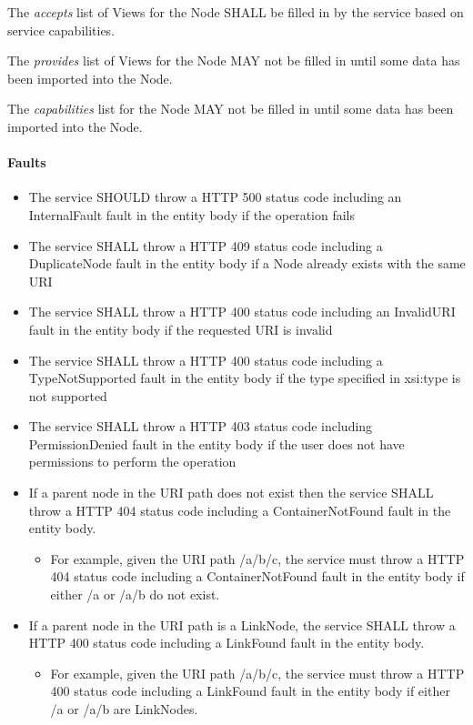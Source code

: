 \documentclass[11pt,a4paper]{ivoa}
\begin{document}
The \emph{accepts} list of Views for the Node SHALL be filled in by the service based on service capabilities.

The \emph{provides} list of Views for the Node MAY not be filled in until some data has been imported into the Node.

The \emph{capabilities} list for the Node MAY not be filled in until some data has been imported into the Node.

\paragraph{Faults}
\begin{itemize}
    \item The service SHOULD throw a HTTP 500 status code including an InternalFault fault in the entity body if the operation fails
    \item The service SHALL throw a HTTP 409 status code including a DuplicateNode fault in the entity body if a Node already exists with the same URI
    \item The service SHALL throw a HTTP 400 status code including an InvalidURI fault in the entity body if the requested URI is invalid
    \item The service SHALL throw a HTTP 400 status code including a TypeNotSupported fault in the entity body if the type specified in xsi:type is not supported
    \item The service SHALL throw a HTTP 403 status code including PermissionDenied fault in the entity body if the user does not have permissions to perform the operation
    \item If a parent node in the URI path does not exist then the service SHALL throw a HTTP 404 status code including a ContainerNotFound fault in the entity body.
    \begin{itemize}
        \item For example, given the URI path /a/b/c, the service must throw a HTTP 404 status code including a ContainerNotFound fault in the entity body if either /a or /a/b do not exist.
    \end{itemize}
    \item If a parent node in the URI path is a LinkNode, the service SHALL throw a HTTP 400 status code including a LinkFound fault in the entity body.
        \begin{itemize}
        \item For example, given the URI path /a/b/c, the service must throw a HTTP 400 status code including a LinkFound fault in the entity body if either /a or /a/b are LinkNodes.
    \end{itemize}
\end{itemize}
\end{document}
